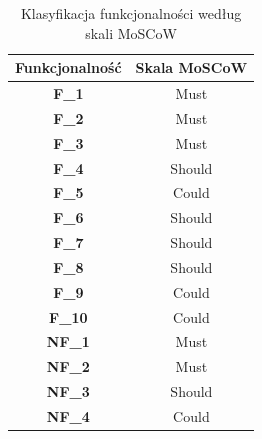 \documentclass[12pt,titlepage]{article}
\begin{document}
\begin{table}[ht]
    \centering
    \renewcommand{\arraystretch}{1.3} 
    \begin{tabular}{|c|c|}
        \hline
        \textbf{Funkcjonalność} & \textbf{Skala MoSCoW} \\ \hline
        \textbf{F\_1}           & Must                  \\ \hline
        \textbf{F\_2}           & Must                  \\ \hline
        \textbf{F\_3}           & Must                  \\ \hline
        \textbf{F\_4}           & Should                \\ \hline
        \textbf{F\_5}           & Could                 \\ \hline
        \textbf{F\_6}           & Should                \\ \hline
        \textbf{F\_7}           & Should                \\ \hline
        \textbf{F\_8}           & Should                \\ \hline
        \textbf{F\_9}           & Could                 \\ \hline
        \textbf{F\_10}          & Could                 \\ \hline
        \textbf{NF\_1}          & Must                  \\ \hline
        \textbf{NF\_2}          & Must                  \\ \hline
        \textbf{NF\_3}          & Should                \\ \hline
        \textbf{NF\_4}          & Could                 \\ \hline
    \end{tabular}
    \caption{Klasyfikacja funkcjonalności według skali MoSCoW}
    \label{tab:moscow-classification}
\end{table}


    
\end{document}
